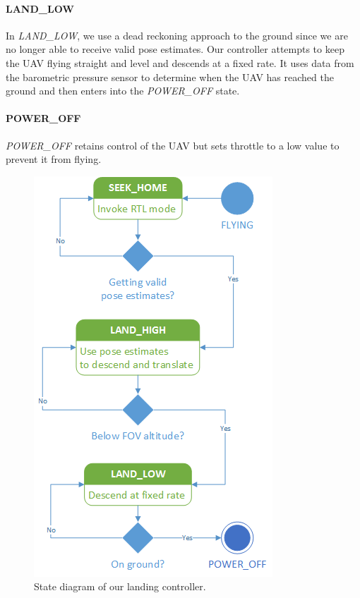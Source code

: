 \documentclass[10pt]{scrartcl} %
\begin{document}
\paragraph{LAND\_LOW}
In \textit{LAND\_LOW}, we use a dead reckoning approach to the ground since we are no longer able to receive valid pose estimates. Our controller attempts to keep the UAV flying straight and level and descends at a fixed rate. It uses data from the barometric pressure sensor to determine when the UAV has reached the ground and then enters into the \textit{POWER\_OFF} state.

\paragraph{POWER\_OFF}
\textit{POWER\_OFF} retains control of the UAV but sets throttle to a low value to prevent it from flying.

\begin{figure}[h]
    \centering
    \includegraphics{images/statediagram.png}
    \caption{State diagram of our landing controller.}
    \label{fig:statediagram}
\end{figure}
\end{document}
